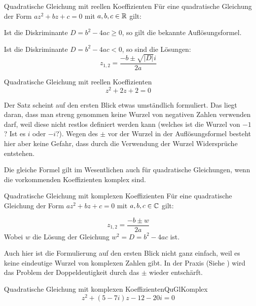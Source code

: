 \begin{satz}
    {Quadratische Gleichung mit reellen Koeffizienten}{}
    Für eine quadratische Gleichung der Form $az^2+bz+c=0$ mit $a,b,c\in\mathbb{R}$ gilt:

    Ist die Diskriminante $D=b^2-4ac \ge0$, so gilt die bekannte Auflösungsformel.

    Ist die Diskriminante $D=b^2-4ac <0$, so sind die Lösungen:
    $$z_{1,2} = \frac{-b\pm \sqrt{|D|}i}{2a}$$
\end{satz}

\begin{bsp}
    {Quadratische Gleichung mit reellen Koeffizienten}{}
    $$z^2+2z+2=0$$

    \vspace*{3cm}

\end{bsp}

Der Satz scheint auf den ersten Blick etwas umständlich formuliert. Das liegt daran, dass man streng genommen keine Wurzel von negativen Zahlen verwenden darf, weil diese nicht restlos definiert werden kann (welches ist die Wurzel von $-1$? Ist es $i$ oder $-i$?). Wegen des $\pm$ vor der Wurzel in der Auflösungsformel besteht hier aber keine Gefahr, dass durch die Verwendung der Wurzel Widersprüche entstehen. 


Die gleiche Formel gilt im Wesentlichen auch für quadratische Gleichungen, wenn die vorkommenden Koeffizienten komplex sind. 
\begin{satz}
    {Quadratische Gleichung mit komplexen Koeffizienten}{}
    Für eine quadratische Gleichung der Form $az^2+bz+c=0$ mit $a,b,c\in\mathbb{C}$ gilt:

    $$z_{1,2} = \frac{-b\pm w}{2a}$$
    Wobei $w$ die Lösung der Gleichung $w^2=D=b^2-4ac$ ist.
\end{satz}

Auch hier ist die Formulierung auf den ersten Blick nicht ganz einfach, weil es keine eindeutige Wurzel von komplexen Zahlen gibt. In der Praxis (Siehe  ) wird das Problem der Doppeldeutigkeit durch das $\pm$ wieder entschärft.

\pagebreak
\begin{bsp}
    {Quadratische Gleichung mit komplexen Koeffizienten}{QuGlKomplex}
    \[
z^2 + (5 - 7i)z - 12 - 20i = 0
\]


\vspace*{20cm}

\end{bsp}

